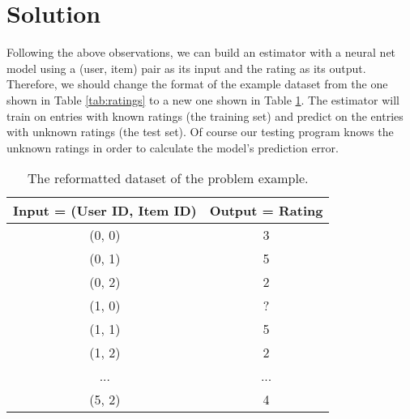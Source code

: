 \documentclass[sigconf]{acmart}
\begin{document}
\section{Solution}
Following the above observations, we can build an estimator with a neural net 
model using a (user, item) pair as its input and the rating as its output.
Therefore, we should change the format of the example dataset from the one 
shown in Table \ref{tab:ratings} to a new one shown in Table \ref{tab:rating}.
The estimator will train on entries with known ratings (the training set) 
and predict on the entries with unknown ratings (the test set).
Of course our testing program knows the unknown ratings in order to calculate 
the model's prediction error.
\begin{table}[!htb]
	\centering
	\caption{The reformatted dataset of the problem example.}
	\begin{tabular}{cc}  \hline
		Input = (User ID, Item ID) & Output = Rating \\ \hline
		(0, 0)                     & 3 \\ \hline
		(0, 1)                     & 5 \\ \hline
		(0, 2)                     & 2 \\ \hline
		(1, 0)                     & ? \\ \hline
		(1, 1)                     & 5 \\ \hline
		(1, 2)                     & 2 \\ \hline
		...                        & ... \\ \hline
		(5, 2)                     & 4 \\ \hline
	\end{tabular}
	\label{tab:rating}
\end{table}
\end{document}
